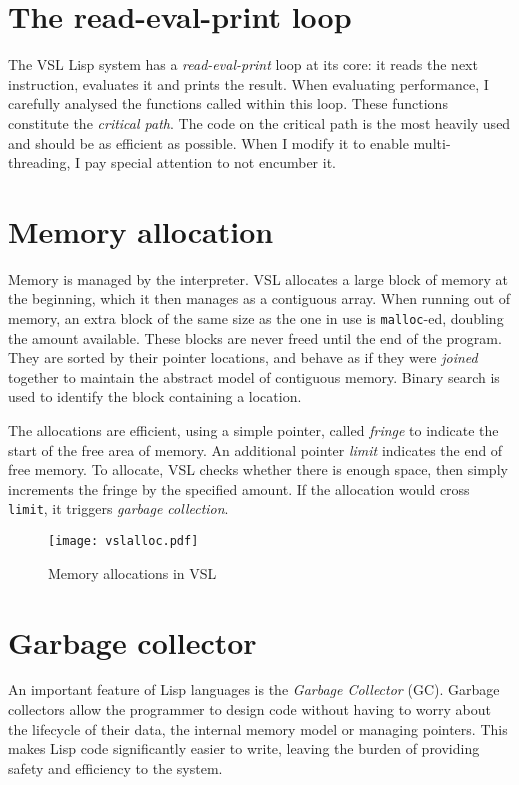 \section{The read-eval-print loop}

The VSL Lisp system has a \emph{read-eval-print} loop at its core: it reads the next instruction, evaluates
it and prints the result. When evaluating performance, I carefully analysed the functions
called within this loop. These functions constitute the \emph{critical path}. The code on the critical
path is the most heavily used and should be as efficient as possible. When I modify it to enable
multi-threading, I pay special attention to not encumber it.

\section{Memory allocation}
Memory is managed by the interpreter. VSL allocates a large block of memory at the beginning,
which it then manages as a contiguous array. When running out of memory, an extra block of the
same size as the one in use is \verb|malloc|-ed, doubling the amount available. These blocks are
never freed until the end of the program. They are sorted by their pointer locations,
and behave as if they were \emph{joined} together to maintain the abstract model of contiguous memory.
Binary search is used to identify the block containing a location.

The allocations are efficient, using a simple pointer, called \emph{fringe} to indicate the start of the
free area of memory. An additional pointer \emph{limit} indicates the end of free memory. To allocate,
VSL checks whether there is enough space, then simply increments the fringe by the specified amount.
If the allocation would cross \verb|limit|, it triggers \emph{garbage collection}.

\begin{figure}[H]
    \centering
    \texttt{[image: vslalloc.pdf]}
    \label{fig:vslalloc}
    \caption{Memory allocations in VSL}
\end{figure}

\section{Garbage collector}
An important feature of Lisp languages is the \emph{Garbage Collector} (GC). Garbage collectors allow the programmer
to design code without having to worry about the lifecycle of their data, the internal memory model or
managing pointers. This makes Lisp code significantly easier to write, leaving the burden of providing safety and
efficiency to the system.

